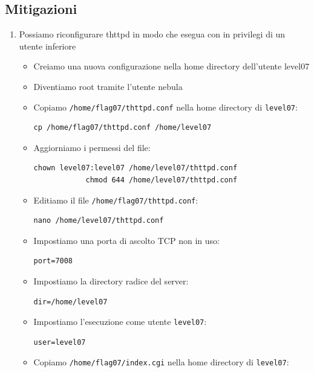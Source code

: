 \subsection{Mitigazioni}
\begin{enumerate}
    \item Possiamo riconfigurare thttpd in modo che esegua con in privilegi di un utente inferiore
    \begin{itemize}
        \item Creiamo una nuova configurazione nella home directory dell’utente level07 
        \item Diventiamo root tramite l’utente nebula 
        \item Copiamo \texttt{/home/flag07/thttpd.conf} nella home directory di \texttt{level07}: 
        \begin{lstlisting}[style=bashstyle]
            cp /home/flag07/thttpd.conf /home/level07
        \end{lstlisting}
        \item Aggiorniamo i permessi del file:
        \begin{lstlisting}[style=bashstyle]
            chown level07:level07 /home/level07/thttpd.conf
            chmod 644 /home/level07/thttpd.conf
        \end{lstlisting}
        \item Editiamo il file \texttt{/home/flag07/thttpd.conf}:
        \begin{lstlisting}[style=bashstyle]
            nano /home/level07/thttpd.conf
        \end{lstlisting}
        \item Impostiamo una porta di ascolto TCP non in uso: 
        \begin{lstlisting}[style=bashstyle]
            port=7008
        \end{lstlisting}
        \item Impostiamo la directory radice del server:
        \begin{lstlisting}[style=bashstyle]
            dir=/home/level07
        \end{lstlisting}
        \item Impostiamo l’esecuzione come utente \texttt{level07}: 
        \begin{lstlisting}[style=bashstyle]
            user=level07
        \end{lstlisting}
        \item Copiamo \texttt{/home/flag07/index.cgi} nella home directory di \texttt{level07}:

\end{itemize}
\end{enumerate}
